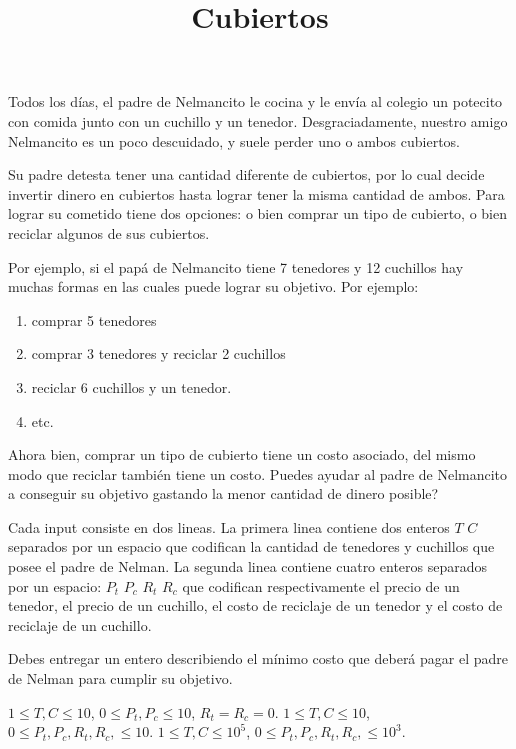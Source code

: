 \documentclass{oci}
\title{Cubiertos}
\begin{document}
\begin{problemDescription}
Todos los días, el padre de Nelmancito le cocina y le envía al colegio un potecito con comida junto con un cuchillo y un tenedor. Desgraciadamente, nuestro amigo Nelmancito es un poco descuidado, y suele perder uno o ambos cubiertos.

Su padre detesta tener una cantidad diferente de cubiertos, por lo cual decide invertir dinero en cubiertos hasta lograr tener la misma cantidad de ambos. Para lograr su cometido tiene dos opciones: o bien comprar un tipo de cubierto, o bien reciclar algunos de sus cubiertos.

Por ejemplo, si el papá de Nelmancito tiene 7 tenedores y 12 cuchillos hay muchas formas en las cuales puede lograr su objetivo. Por ejemplo: 

\begin{enumerate}
	\item comprar 5 tenedores
	\item comprar 3 tenedores y reciclar 2 cuchillos
	\item reciclar 6 cuchillos y un tenedor.
	\item etc.
\end{enumerate}

Ahora bien, comprar un tipo de cubierto tiene un costo asociado, del mismo modo que reciclar también tiene un costo. Puedes ayudar al padre de Nelmancito a conseguir su objetivo gastando la menor cantidad de dinero posible?


\end{problemDescription}

\begin{inputDescription}
Cada input consiste en dos lineas. La primera linea contiene dos enteros $T$ $C$ separados por un espacio que codifican la cantidad de tenedores y cuchillos que posee el padre de Nelman. La segunda linea contiene cuatro enteros separados por un espacio: $P_t$ $P_c$ $R_t$ $R_c$ que codifican respectivamente el precio de un tenedor, el precio de un cuchillo, el costo de reciclaje de un tenedor y el costo de reciclaje de un cuchillo.
\end{inputDescription}

\begin{outputDescription}
Debes entregar un entero describiendo el mínimo costo que deberá pagar el padre de Nelman para cumplir su objetivo.
\end{outputDescription}

\begin{scoreDescription}
   $1 \leq T,C \leq 10$, $ 0 \leq P_t, P_c \leq 10$, $ R_t= R_c = 0$.
   $1 \leq T,C \leq 10$, $ 0 \leq P_t, P_c, R_t, R_c, \leq 10$.
   $1 \leq T,C \leq 10^5$, $ 0 \leq P_t, P_c, R_t, R_c, \leq 10^3$.
\end{scoreDescription}

\begin{sampleDescription}
\end{sampleDescription}
\end{document}
